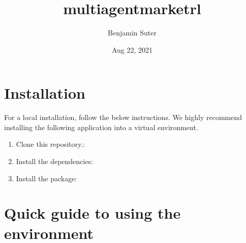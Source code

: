\documentclass[letterpaper,10pt,english]{sphinxmanual}
\title{multi\sphinxhyphen{}agent\sphinxhyphen{}market\sphinxhyphen{}rl}
\date{Aug 22, 2021}
\author{Benjamin Suter}
\begin{document}
\pagestyle{empty}
\sphinxmaketitle
\pagestyle{plain}
\sphinxtableofcontents
\pagestyle{normal}
\label{\detokenize{index::doc}}



\chapter{Installation}
\label{\detokenize{installation:installation}}\label{\detokenize{installation::doc}}
\sphinxAtStartPar
For a local installation, follow the below instructions.
We highly recommend installing the following application into a virtual environment.
\begin{enumerate}
%
\item {} 
\sphinxAtStartPar
Clone this repository.:

\begin{sphinxVerbatim}[commandchars=\\\{\}]
  
 
\end{sphinxVerbatim}

\item {} 
\sphinxAtStartPar
Install the dependencies:

\begin{sphinxVerbatim}[commandchars=\\\{\}]
   
\end{sphinxVerbatim}

\item {} 
\sphinxAtStartPar
Install the package:

\begin{sphinxVerbatim}[commandchars=\\\{\}]
   
\end{sphinxVerbatim}

\end{enumerate}


\chapter{Quick guide to using the environment}
\label{\detokenize{UsingTheEnvironment:quick-guide-to-using-the-environment}}\label{\detokenize{UsingTheEnvironment::doc}}
\end{document}
